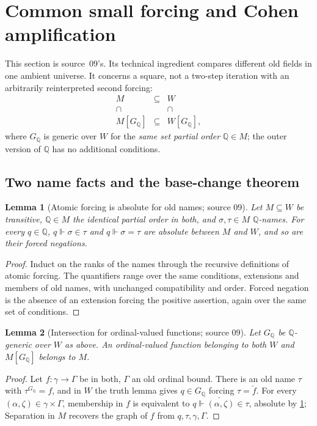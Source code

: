 \documentclass[11pt,letterpaper]{article}
\numberwithin{equation}{section}
\newtheorem{lemma}[lemma]{Lemma}
\theoremstyle{definition}
\theoremstyle{remark}
\newcommand{\forces}{\Vdash}
\begin{document}
\section{Common small forcing and Cohen amplification}\label{univ:gs:sec:amplification}

This section is source~09's. Its technical ingredient compares different old fields in one
ambient universe. It concerns a square, not a two-step iteration with an arbitrarily
reinterpreted second forcing:
\[
 \begin{array}{ccc}
 M&\subseteq&W\\[-1pt]
 \cap&&\cap\\[-1pt]
 M[G_{\mathbb Q}]&\subseteq&W[G_{\mathbb Q}],
 \end{array}
\]
where $G_{\mathbb Q}$ is generic over $W$ for the \emph{same set partial order}
$\mathbb Q\in M$; the outer version of $\mathbb Q$ has no additional conditions.

\subsection{Two name facts and the base-change theorem}

\begin{lemma}[Atomic forcing is absolute for old names; source 09]\label{univ:gs:lem:atomic}
Let $M\subseteq W$ be transitive, $\mathbb Q\in M$ the identical partial order in both, and
$\sigma,\tau\in M$ $\mathbb Q$-names. For every $q\in\mathbb Q$, $q\forces\sigma\in\tau$ and
$q\forces\sigma=\tau$ are absolute between $M$ and $W$, and so are their forced negations.
\end{lemma}
\begin{proof}
Induct on the ranks of the names through the recursive definitions of atomic forcing. The
quantifiers range over the same conditions, extensions and members of old names, with
unchanged compatibility and order. Forced negation is the absence of an extension forcing the
positive assertion, again over the same set of conditions.
\end{proof}

\begin{lemma}[Intersection for ordinal-valued functions; source 09]\label{univ:gs:lem:nestedintersection}
Let $G_{\mathbb Q}$ be $\mathbb Q$-generic over $W$ as above. An ordinal-valued function
belonging to both $W$ and $M[G_{\mathbb Q}]$ belongs to $M$.
\end{lemma}
\begin{proof}
Let $f:\gamma\to\Gamma$ be in both, $\Gamma$ an old ordinal bound. There is an old name $\tau$
with $\tau^{G_{\mathbb Q}}=f$, and in $W$ the truth lemma gives $q\in G_{\mathbb Q}$ forcing
$\tau=\check f$. For every $(\alpha,\zeta)\in\gamma\times\Gamma$, membership in $f$ is
equivalent to $q\forces\check{(\alpha,\zeta)}\in\tau$, absolute by
\cref{univ:gs:lem:atomic}; Separation in $M$ recovers the graph of $f$ from
$q,\tau,\gamma,\Gamma$.
\end{proof}
\end{document}
